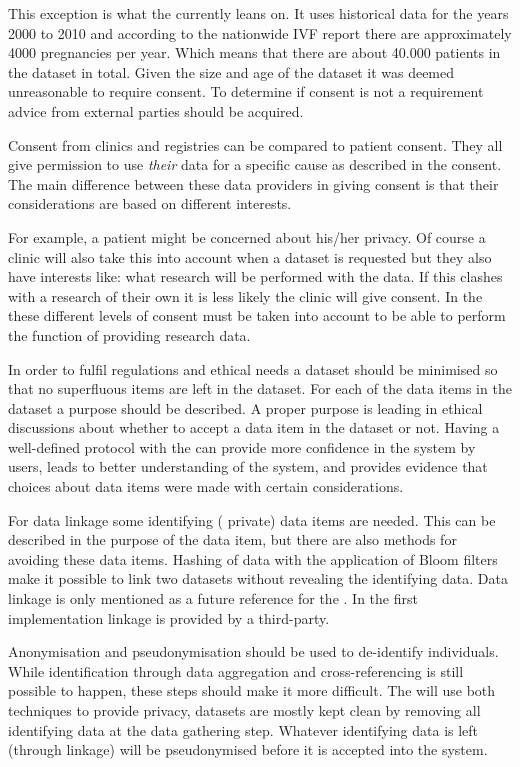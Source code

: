 This exception is what the \ivfsystem{} currently leans on. 
It uses historical data for the years 2000 to 2010 and according to the nationwide IVF report \cite{ivfReportNVOG} there are approximately 4000 pregnancies per year.
Which means that there are about 40.000 patients in the dataset in total.
Given the size and age of the dataset it was deemed unreasonable to require consent.
To determine if consent is not a requirement advice from external parties should be acquired.

Consent from clinics and registries can be compared to patient consent.
They all give permission to use \emph{their} data for a specific cause as described in the consent.
The main difference between these data providers in giving consent is that their considerations are based on different interests.

For example, a patient might be concerned about his/her privacy.
Of course a clinic will also take this into account when a dataset is requested but they also have interests like: what research will be performed with the data.
If this clashes with a research of their own it is less likely the clinic will give consent.
In the \ivfsystem{} these different levels of consent must be taken into account  to be able to perform the function of providing research data.

In order to fulfil regulations and ethical needs a dataset should be minimised so that no superfluous items are left in the dataset.
For each of the data items in the dataset a purpose should be described. 
A proper purpose is leading in ethical discussions about whether to accept a data item in the dataset or not.
Having a well-defined protocol with the \ivfsystem{} can provide more confidence in the system by users, leads to better understanding of the system, and provides evidence that choices about data items were made with certain considerations.

For data linkage some identifying (\ie{} private) data items are needed.
This can be described in the purpose of the data item, but there are also methods for avoiding these data items.
Hashing of data with the application of Bloom filters make it possible to link two datasets without revealing the identifying data.
Data linkage is only mentioned as a future reference for the \ivfsystem{}.
In the first implementation linkage is provided by a third-party.

Anonymisation and pseudonymisation should be used to de-identify individuals.
While identification through data aggregation and cross-referencing is still possible to happen, these steps should make it more difficult.
The \ivfsystem{} will use both techniques to provide privacy, datasets are mostly kept clean by removing all identifying data at the data gathering step.
Whatever identifying data is left (through linkage) will be pseudonymised before it is accepted into the system.

